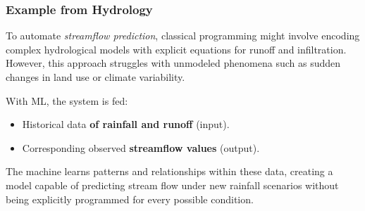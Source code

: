 \subsubsection{Example from Hydrology}

To automate \textit{streamflow prediction}, classical programming might involve encoding complex hydrological models with explicit equations for runoff and infiltration. However, this approach struggles with unmodeled phenomena such as sudden changes in land use or climate variability.

With ML, the system is fed:
\begin{itemize}
    \item Historical data \textbf{ of rainfall and runoff} (input).
    \item Corresponding observed \textbf{streamflow values} (output).
\end{itemize}

The machine learns patterns and relationships within these data, creating a model capable of predicting stream flow under new rainfall scenarios without being explicitly programmed for every possible condition.

